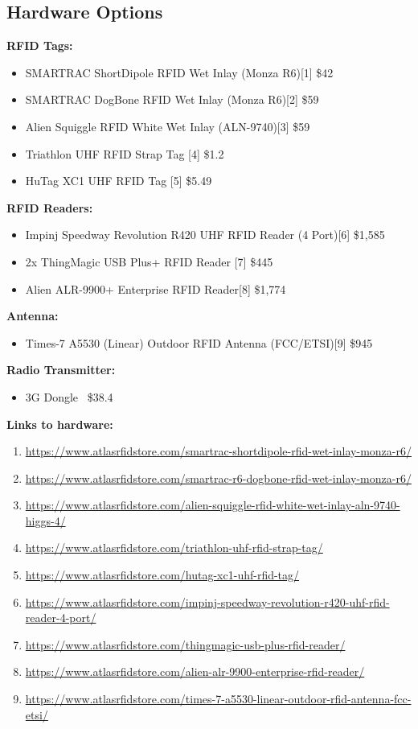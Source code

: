 \documentclass{article}
\begin{document}
\subsection{Hardware Options}
 \textbf{RFID Tags:} 
 \begin{itemize}
	\item SMARTRAC ShortDipole RFID Wet Inlay (Monza R6)[1] \quad \$42
	\item SMARTRAC DogBone RFID Wet Inlay (Monza R6)[2] \quad	\$59
	\item Alien Squiggle RFID White Wet Inlay (ALN-9740)[3] \quad	\$59
	\item Triathlon UHF RFID Strap Tag [4] \quad	\$1.2
	\item HuTag XC1 UHF RFID Tag [5] \quad \$5.49

\end{itemize} 
 \textbf{RFID Readers:} 
  \begin{itemize}
	\item Impinj Speedway Revolution R420 UHF RFID Reader (4 Port)[6] \quad \$1,585
	\item 2x ThingMagic USB Plus+ RFID Reader [7] \quad \$445
	\item Alien ALR-9900+ Enterprise RFID Reader[8] \quad \$1,774
\end{itemize} 
 \textbf{Antenna:} 
 \begin{itemize}
	\item Times-7 A5530 (Linear) Outdoor RFID Antenna (FCC/ETSI)[9] \quad \$945
\end{itemize} 
\textbf{Radio Transmitter:} 
 \begin{itemize}
	\item 3G Dongle ~\$38.4
\end{itemize} 

\bigskip
\noindent
 \textbf{Links to hardware:} 
 \begin{enumerate}
	\item \url{https://www.atlasrfidstore.com/smartrac-shortdipole-rfid-wet-inlay-monza-r6/ } 
	\item \url{https://www.atlasrfidstore.com/smartrac-r6-dogbone-rfid-wet-inlay-monza-r6/ }
	\item \url{https://www.atlasrfidstore.com/alien-squiggle-rfid-white-wet-inlay-aln-9740-higgs-4/}  
	\item \url{https://www.atlasrfidstore.com/triathlon-uhf-rfid-strap-tag/}
	\item \url{https://www.atlasrfidstore.com/hutag-xc1-uhf-rfid-tag/}
	\item \url{https://www.atlasrfidstore.com/impinj-speedway-revolution-r420-uhf-rfid-reader-4-port/} 
	\item \url{https://www.atlasrfidstore.com/thingmagic-usb-plus-rfid-reader/} 
	\item \url{https://www.atlasrfidstore.com/alien-alr-9900-enterprise-rfid-reader/} 
	\item \url{https://www.atlasrfidstore.com/times-7-a5530-linear-outdoor-rfid-antenna-fcc-etsi/} 
\end{enumerate}
\end{document}
